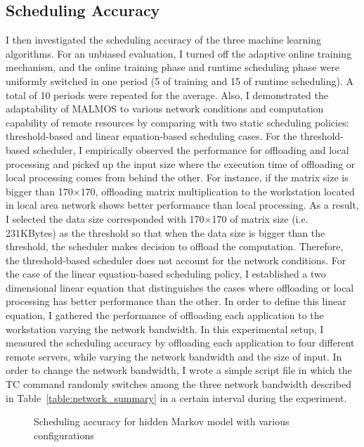 {{\subsection{Scheduling Accuracy}
\label{online:accuracy}
I then investigated the scheduling accuracy of the three machine learning
algorithms.
%
For an unbiased evaluation, I turned off the adaptive online training
mechanism, and the online training phase and runtime scheduling phase were
uniformly switched in one period (5 of training and 15 of runtime
scheduling).
%
A total of 10 periods were repeated for the average.
%
Also, I demonstrated the adaptability of MALMOS to various network
conditions and computation capability of remote resources by comparing
with two static scheduling policies: threshold-based and linear
equation-based scheduling cases.
%
For the threshold-based scheduler, I empirically observed the
performance for offloading and local processing and picked up the input
size where the execution time of offloading or local processing comes from
behind the other.
%
For instance, if the matrix size is bigger than 170$\times$170,
offloading matrix multiplication to the workstation located in local
area network shows better performance than local processing.
%
As a result, I selected the data size corresponded with 170$\times$170 of matrix
size (i.e. 231KBytes) as the threshold so that when the data size is bigger than the
threshold, the scheduler makes decision to offload the computation.   
%
Therefore, the threshold-based scheduler does not account for the network
conditions.
%
For the case of the linear equation-based scheduling policy, I
established a two dimensional linear equation that distinguishes the
cases where offloading or local processing has better performance than
the other.
%
In order to define this linear equation, I gathered the performance of
offloading each application to the workstation varying the network
bandwidth.
%
In this experimental setup, I measured the scheduling accuracy by
offloading each application to four different remote servers, while
varying the network bandwidth and the size of input.
%
In order to change the network bandwidth, I wrote a simple script file
in which the TC command randomly switches among the three network
bandwidth described in Table~\ref{table:network_summary} in a certain interval during the
experiment.\\
%
\begin{figure}
\centering
{}
\caption{Scheduling accuracy for hidden Markov model with various
configurations}

\end{figure}}}
